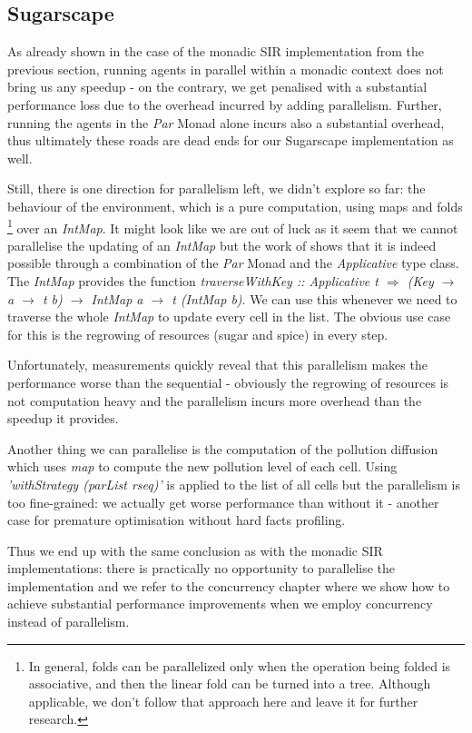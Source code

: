 \subsection{Sugarscape}
As already shown in the case of the monadic SIR implementation from the previous section, running agents in parallel within a monadic context does not bring us any speedup - on the contrary, we get penalised with a substantial performance loss due to the overhead incurred by adding parallelism. Further, running the agents in the \textit{Par} Monad alone incurs also a substantial overhead, thus ultimately these roads are dead ends for our Sugarscape implementation as well.

Still, there is one direction for parallelism left, we didn't explore so far: the behaviour of the environment, which is a pure computation, using maps and folds \footnote{In general, folds can be parallelized only when the operation being folded is associative, and then the linear fold can be turned into a tree. Although applicable, we don't follow that approach here and leave it for further research.} over an \textit{IntMap}. It might look like we are out of luck as it seem that we cannot parallelise the updating of an \textit{IntMap} but the work of \cite{marlow_parallel_2013} shows that it is indeed possible through a combination of the \textit{Par} Monad and the \textit{Applicative} type class. The \textit{IntMap} provides the function \textit{traverseWithKey :: Applicative t $\Rightarrow$ (Key $\rightarrow$ a $\rightarrow$ t b) $\rightarrow$ IntMap a $\rightarrow$ t (IntMap b)}. We can use this whenever we need to traverse the whole \textit{IntMap} to update every cell in the list. The obvious use case for this is the regrowing of resources (sugar and spice) in every step.

Unfortunately, measurements quickly reveal that this parallelism makes the performance worse than the sequential - obviously the regrowing of resources is not computation heavy and the parallelism incurs more overhead than the speedup it provides.

Another thing we can parallelise is the computation of the pollution diffusion which uses \textit{map} to compute the new pollution level of each cell. Using \textit{'withStrategy (parList rseq)'} is applied to the list of all cells but the parallelism is too fine-grained: we actually get worse performance than without it - another case for premature optimisation without hard facts profiling.

Thus we end up with the same conclusion as with the monadic SIR implementations: there is practically no opportunity to parallelise the implementation and we refer to the concurrency chapter where we show how to achieve substantial performance improvements when we employ concurrency instead of parallelism.